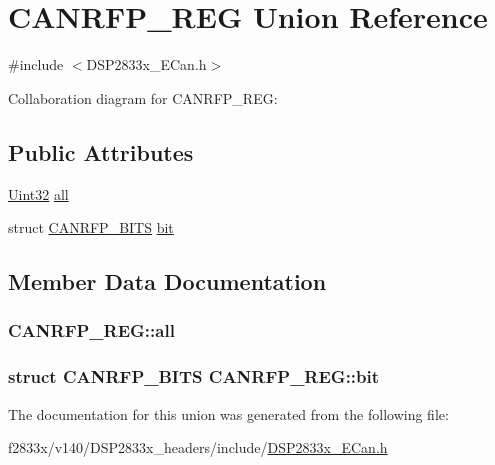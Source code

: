 \hypertarget{union_c_a_n_r_f_p___r_e_g}{}\section{C\+A\+N\+R\+F\+P\+\_\+\+R\+E\+G Union Reference}
\label{union_c_a_n_r_f_p___r_e_g}


{\ttfamily \#include $<$D\+S\+P2833x\+\_\+\+E\+Can.\+h$>$}



Collaboration diagram for C\+A\+N\+R\+F\+P\+\_\+\+R\+E\+G\+:
\subsection*{Public Attributes}
\begin{DoxyCompactItemize}
\item 
\hyperlink{_d_s_p2833x___device_8h_aba99025e657f892beb7ff31cecf64653}{Uint32} \hyperlink{union_c_a_n_r_f_p___r_e_g_a350d92b24c37b3ecef98b527e784fce7}{all}
\item 
struct \hyperlink{struct_c_a_n_r_f_p___b_i_t_s}{C\+A\+N\+R\+F\+P\+\_\+\+B\+I\+T\+S} \hyperlink{union_c_a_n_r_f_p___r_e_g_aca8df14b2d3a5cc229d57d7ee6499148}{bit}
\end{DoxyCompactItemize}


\subsection{Member Data Documentation}
\hypertarget{union_c_a_n_r_f_p___r_e_g_a350d92b24c37b3ecef98b527e784fce7}{}
\subsubsection[{all}]{ C\+A\+N\+R\+F\+P\+\_\+\+R\+E\+G\+::all}\label{union_c_a_n_r_f_p___r_e_g_a350d92b24c37b3ecef98b527e784fce7}
\hypertarget{union_c_a_n_r_f_p___r_e_g_aca8df14b2d3a5cc229d57d7ee6499148}{}
\subsubsection[{bit}]{\setlength{\rightskip}{0pt plus 5cm}struct {\bf C\+A\+N\+R\+F\+P\+\_\+\+B\+I\+T\+S} C\+A\+N\+R\+F\+P\+\_\+\+R\+E\+G\+::bit}\label{union_c_a_n_r_f_p___r_e_g_aca8df14b2d3a5cc229d57d7ee6499148}


The documentation for this union was generated from the following file\+:\begin{DoxyCompactItemize}
\item 
f2833x/v140/\+D\+S\+P2833x\+\_\+headers/include/\hyperlink{_d_s_p2833x___e_can_8h}{D\+S\+P2833x\+\_\+\+E\+Can.\+h}\end{DoxyCompactItemize}
